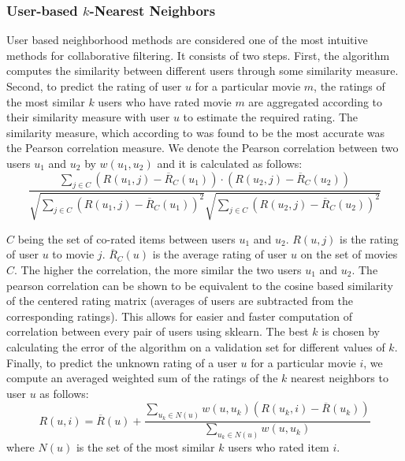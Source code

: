 \documentclass[10pt,conference,compsocconf]{IEEEtran}
\begin{document}
\subsubsection*{\textbf{User-based $k$-Nearest Neighbors}} User based neighborhood methods are considered one of the most intuitive methods for collaborative filtering. It consists of two steps. First, the algorithm computes the similarity between different users through some similarity measure. Second, to predict the rating of user $u$ for a particular movie $m$, the ratings of the most similar $k$ users who have rated movie $m$ are aggregated according to their similarity measure with user $u$ to estimate the required rating. The similarity measure, which according to \cite{L10} was found to be the most accurate was the Pearson correlation measure. We denote the Pearson correlation between two users $u_1$ and $u_2$ by $w(u_1, u_2)$ and it is calculated as follows:
\begin{equation} \label{eqn:pearson}
\frac{\sum_{j \in C} (R(u_1, j) - \overline{R}_C(u_1))\cdot(R(u_2, j) - \overline{R}_C(u_2))}{\sqrt{\sum_{j \in C} (R(u_1, j) - \overline{R}_C(u_1))^2} \sqrt{\sum_{j \in C} (R(u_2, j) - \overline{R}_C(u_2))^2}}
\end{equation}

$C$ being the set of co-rated items between users $u_1$ and $u_2$. $R(u,j)$ is the rating of user $u$ to movie $j$. $\overline{R}_C(u)$ is the average rating of user $u$ on the set of movies $C$. The higher the correlation, the more similar the two users $u_1$ and $u_2$. The pearson correlation can be shown \cite{L10} to be equivalent to the cosine based similarity of the centered rating matrix (averages of users are subtracted from the corresponding ratings). This allows for easier and faster computation of correlation between every pair of users using sklearn. The best $k$ is chosen by calculating the error of the algorithm on a validation set for different values of $k$. Finally, to predict the unknown rating of a user $u$ for a particular movie $i$, we compute an averaged weighted sum of the ratings of the $k$ nearest neighbors to user $u$ as follows:
\begin{equation} \label{eqn:predict_user_based}
R(u,i) = \overline{R}(u) + \frac{\sum_{u_k \in N(u)} w(u,u_k)(R(u_k,i) - \overline{R}(u_k))}{\sum_{u_k \in N(u)} w(u,u_k)}
\end{equation}
where $N(u)$ is the set of the most similar $k$ users who rated item $i$.
\\
\end{document}
